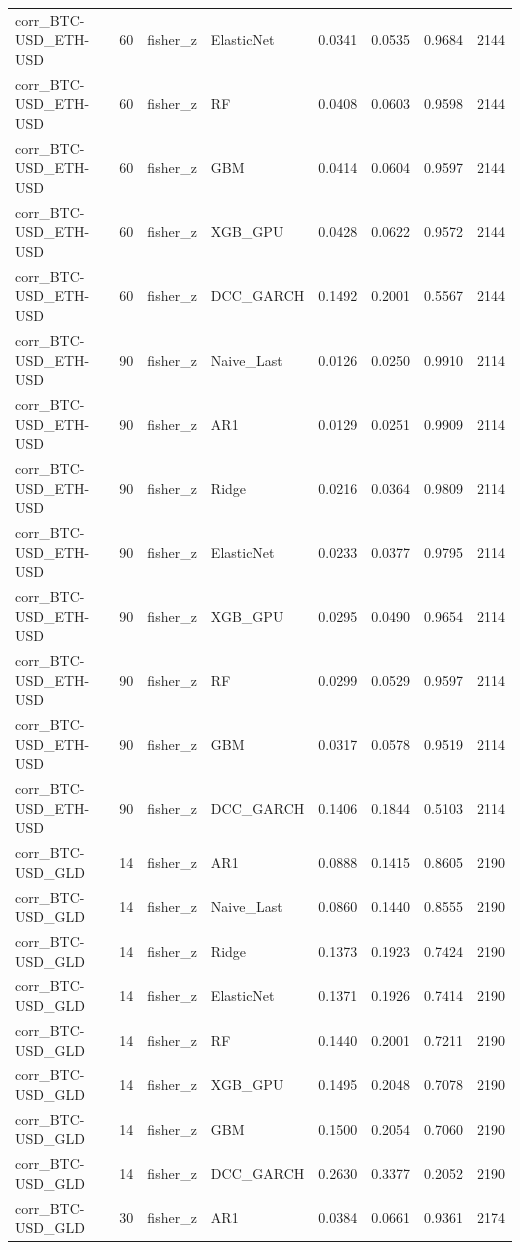 \begin{table}[H]
\begin{tabular}{llllrrrr}
corr_BTC-USD_ETH-USD & 60 & fisher_z & ElasticNet & 0.0341 & 0.0535 & 0.9684 & 2144 \\
corr_BTC-USD_ETH-USD & 60 & fisher_z & RF & 0.0408 & 0.0603 & 0.9598 & 2144 \\
corr_BTC-USD_ETH-USD & 60 & fisher_z & GBM & 0.0414 & 0.0604 & 0.9597 & 2144 \\
corr_BTC-USD_ETH-USD & 60 & fisher_z & XGB_GPU & 0.0428 & 0.0622 & 0.9572 & 2144 \\
corr_BTC-USD_ETH-USD & 60 & fisher_z & DCC_GARCH & 0.1492 & 0.2001 & 0.5567 & 2144 \\
corr_BTC-USD_ETH-USD & 90 & fisher_z & Naive_Last & 0.0126 & 0.0250 & 0.9910 & 2114 \\
corr_BTC-USD_ETH-USD & 90 & fisher_z & AR1 & 0.0129 & 0.0251 & 0.9909 & 2114 \\
corr_BTC-USD_ETH-USD & 90 & fisher_z & Ridge & 0.0216 & 0.0364 & 0.9809 & 2114 \\
corr_BTC-USD_ETH-USD & 90 & fisher_z & ElasticNet & 0.0233 & 0.0377 & 0.9795 & 2114 \\
corr_BTC-USD_ETH-USD & 90 & fisher_z & XGB_GPU & 0.0295 & 0.0490 & 0.9654 & 2114 \\
corr_BTC-USD_ETH-USD & 90 & fisher_z & RF & 0.0299 & 0.0529 & 0.9597 & 2114 \\
corr_BTC-USD_ETH-USD & 90 & fisher_z & GBM & 0.0317 & 0.0578 & 0.9519 & 2114 \\
corr_BTC-USD_ETH-USD & 90 & fisher_z & DCC_GARCH & 0.1406 & 0.1844 & 0.5103 & 2114 \\
corr_BTC-USD_GLD & 14 & fisher_z & AR1 & 0.0888 & 0.1415 & 0.8605 & 2190 \\
corr_BTC-USD_GLD & 14 & fisher_z & Naive_Last & 0.0860 & 0.1440 & 0.8555 & 2190 \\
corr_BTC-USD_GLD & 14 & fisher_z & Ridge & 0.1373 & 0.1923 & 0.7424 & 2190 \\
corr_BTC-USD_GLD & 14 & fisher_z & ElasticNet & 0.1371 & 0.1926 & 0.7414 & 2190 \\
corr_BTC-USD_GLD & 14 & fisher_z & RF & 0.1440 & 0.2001 & 0.7211 & 2190 \\
corr_BTC-USD_GLD & 14 & fisher_z & XGB_GPU & 0.1495 & 0.2048 & 0.7078 & 2190 \\
corr_BTC-USD_GLD & 14 & fisher_z & GBM & 0.1500 & 0.2054 & 0.7060 & 2190 \\
corr_BTC-USD_GLD & 14 & fisher_z & DCC_GARCH & 0.2630 & 0.3377 & 0.2052 & 2190 \\
corr_BTC-USD_GLD & 30 & fisher_z & AR1 & 0.0384 & 0.0661 & 0.9361 & 2174 \\

\end{tabular}
\end{table}
